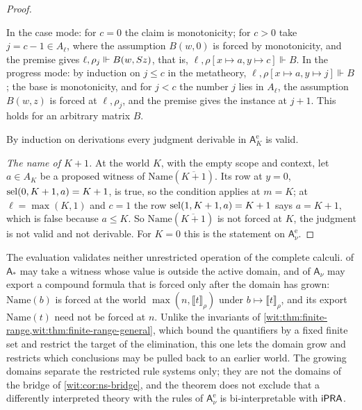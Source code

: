\begin{proof}
\begin{itemize}
 In the case mode: for $c=0$ the claim is monotonicity; for $c>0$ take
 $j=c-1\in A_\ell$, where the assumption $B(w,0)$ is forced by monotonicity,
 and the premise gives $\ell,\rho_j\Vdash B(w,S z)$, that is,
 $\ell,\rho[x\mapsto a,y\mapsto c]\Vdash B$.  In the progress mode: by
 induction on $j\le c$ in the metatheory, $\ell,\rho[x\mapsto a,y\mapsto j]\Vdash B$;
 the base is monotonicity, and for $j<c$ the number $j$ lies in $A_\ell$, the
 assumption $B(w,z)$ is forced at $\ell,\rho_j$, and the premise gives the
 instance at $j+1$.  This holds for an arbitrary matrix $B$.
\end{itemize}
By induction on derivations every judgment derivable in
$\mathsf{A}^{\mathrm e}_{K}$ is valid.

\emph{The name of $K+1$.}  At the world $K$, with the empty scope and
context, let $a\in A_K$ be a proposed witness of
$\mathrm{Name}(\overline{K+1})$.  Its row at $y=0$, $\operatorname{sel}(0,K+1,a)=K+1$, is
true, so the condition applies at $m=K$; at $\ell=\max(K,1)$ and $c=1$ the
row $\operatorname{sel}(1,K+1,a)=K+1$ says $a=K+1$, which is false because $a\le K$.  So
$\mathrm{Name}(\overline{K+1})$ is not forced at $K$, the judgment is not
valid and not derivable.  For $K=0$ this is the statement on
$\mathsf{A}^{\mathrm e}_{\nu}$.
\end{proof}

\begin{remark}
\label{wit:rem:ns-obstruction}
The evaluation validates neither unrestricted operation of the complete
calculi.   of $\mathsf{A}_{\ast}$ may take a witness whose
value is outside the active domain, and  of
$\mathsf{A}_{\nu}$ may export a compound formula that is forced only after
the domain has grown: $\mathrm{Name}(b)$ is forced at the world
$\max(n,\llbracket t\rrbracket_\rho)$ under $b\mapsto\llbracket t\rrbracket_\rho$,
and its export $\mathrm{Name}(t)$ need not be forced at $n$.  Unlike the
invariants of \cref{wit:thm:finite-range,wit:thm:finite-range-general},
which bound the quantifiers by a fixed finite set and restrict the target of
the elimination, this one lets the domain grow and restricts which
conclusions may be pulled back to an earlier world.  The growing domains
separate the restricted rule systems only; they are not the domains of the
bridge of \cref{wit:cor:ns-bridge}, and the theorem does not exclude that a
differently interpreted theory with the rules of $\mathsf{A}^{\mathrm e}_{\nu}$
is bi-interpretable with $\mathsf{iPRA}$.
\end{remark}

